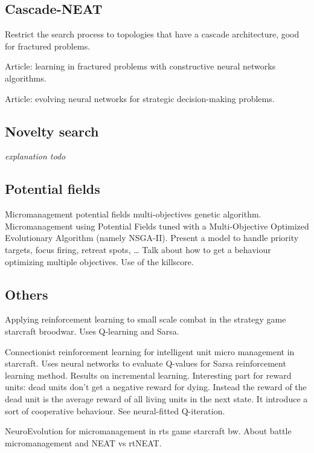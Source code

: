 \subsection{Cascade-NEAT}

Restrict the search process to topologies that have a cascade
architecture, good for fractured problems.

Article: learning in fractured problems with constructive neural networks algorithms.

Article: evolving neural networks for strategic decision-making problems.

\subsection{Novelty search}

\emph{explanation todo} \cite{LeSt11}

\subsection{Potential fields}

Micromanagement potential fields multi-objectives genetic
algorithm. Micromanagement using Potential Fields tuned with a
Multi-Objective Optimized Evolutionary Algorithm (namely
NSGA-II). Present a model to handle priority targets, focus firing,
retreat spots, … Talk about how to get a behaviour optimizing multiple
objectives. Use of the killscore.

\citet{SiSuBa14}

\subsection{Others}

Applying reinforcement learning to small scale combat in the strategy
game starcraft broodwar. Uses Q-learning and Sarsa.

Connectionist reinforcement learning for intelligent unit micro
management in starcraft.  Uses neural networks to evaluate Q-values
for Sarsa reinforcement learning method. Results on incremental
learning.  Interesting part for reward units: dead units don’t get a
negative reward for dying.  Instead the reward of the dead unit is the
average reward of all living units in the next state.  It introduce a
sort of cooperative behaviour. See neural-fitted Q-iteration.

NeuroEvolution for micromanagement in rts game starcraft bw. About
battle micromanagement and NEAT vs rtNEAT.

